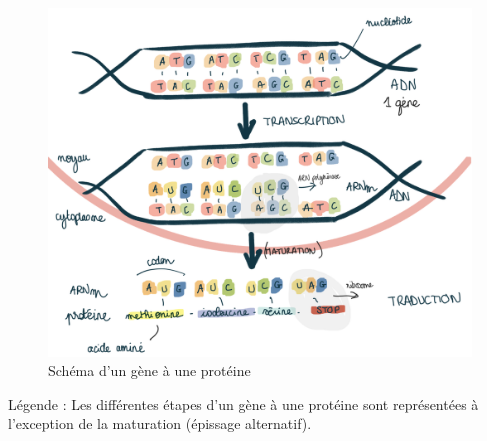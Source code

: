 \begin{figure}[H]
    \centering
    \includegraphics[width=1\textwidth]{figures/corps/figure1.png}
    \caption{Schéma d'un gène à une protéine}
    \label{fig:1_genetoprotein}
\end{figure}
Légende : Les différentes étapes d’un gène à une protéine sont représentées à l’exception de la maturation (épissage alternatif).\\

